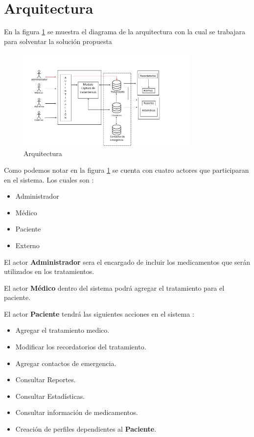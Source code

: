 \section{Arquitectura}

En la figura \ref{fig:arquitectura} se muestra el diagrama de la arquitectura con la cual se trabajara para solventar la solución propuesta


\begin{figure}[htb]
	\centering
	\includegraphics[width=0.8\textwidth]{images/cap2/Arquitectura}
	\caption{Arquitectura} \label{fig:arquitectura}
\end{figure}

Como podemos notar en la figura \ref{fig:arquitectura} se cuenta con cuatro actores que participaran en el sistema. Los cuales son :
\begin{itemize}
	\item Administrador
	\item Médico
	\item Paciente
	\item Externo
\end{itemize}

El actor \textbf{Administrador} sera el encargado de incluir los medicamentos que serán utilizados en los tratamientos.

El actor \textbf{Médico} dentro del sistema podrá agregar el tratamiento para el paciente.

El actor \textbf{Paciente} tendrá las siguientes acciones en el sistema :
\begin{itemize}
	\item Agregar el tratamiento medico.
	\item Modificar los recordatorios del tratamiento.
	\item Agregar contactos de emergencia.
	\item Consultar Reportes.
	\item Consultar Estadísticas.
	\item Consultar información de medicamentos.
	\item Creación de perfiles dependientes al \textbf{Paciente}.
\end{itemize}

